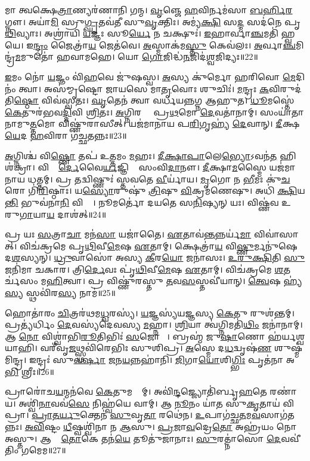 𑌮𑌾 𑌤𑍍𑌵𑌕𑍍𑌷𑍇\ul{𑌤𑍍𑌰𑌾}𑌣𑍍𑌯𑌰॑𑌣𑌾𑌨𑌿 𑌗𑌨𑍍𑌮।
\ul{𑌵𑍃}𑌞𑍍𑌜𑍇 \ul{𑌹}𑌵𑌿𑌰𑍍𑌨𑌮॑𑌸𑌾 \ul{𑌬}\ul{𑌰𑍍}𑌹𑌿\ul{𑌰}𑌗𑍍𑌨𑍗।
𑌅𑌯𑌾॑\ul{𑌮𑌿} 𑌸𑍍𑌰𑍁\ul{𑌗𑍍𑌘𑍃}𑌤𑌵॑𑌤𑍀 𑌸𑍁\ul{𑌵𑍃}𑌕𑍍𑌤𑌿𑌃।
𑌅𑌮𑍍𑌯॑\ul{𑌕𑍍𑌷𑌿} 𑌸\ul{𑌦𑍍𑌮} 𑌸𑌦॑𑌨𑍇 𑌪𑍃\ul{𑌥𑌿}𑌵𑍍𑌯𑌾𑌃।
𑌅𑌶𑍍𑌰𑌾॑𑌯𑌿 \ul{𑌯}𑌜𑍍𑌞𑌃 𑌸𑍂\ul{𑌰𑍍𑌯𑍇} 𑌨 𑌚𑌕𑍍𑌷𑍁𑌃॑।
\ul{𑌇}𑌹𑌾𑌰𑍍𑌵𑌾\ul{𑌞𑍍𑌚}𑌮𑌤𑌿॑ 𑌹𑍍𑌵𑌯𑍇।
𑌇\ul{𑌨𑍍𑌦𑍍𑌰𑌂} 𑌜𑍈𑌤𑍍𑌰𑌾॑\ul{𑌯} 𑌜𑍇𑌤॑𑌵𑍇।
\ul{𑌅}𑌸𑍍𑌮𑌾𑌕॑𑌮\ul{𑌸𑍍𑌤𑍁} 𑌕𑍇𑌵॑𑌲𑌃।
\ul{𑌅}𑌰𑍍𑌵𑌾\ul{𑌞𑍍𑌚}𑌮𑌿𑌨𑍍𑌦𑍍𑌰॑\ul{𑌮}𑌮𑍁𑌤𑍋॑ 𑌹𑌵𑌾𑌮𑌹𑍇।
𑌯𑍋 \ul{𑌗𑍋}𑌜𑌿𑌦𑍍𑌧॑\ul{𑌨}𑌜𑌿𑌦॑\ul{𑌶𑍍𑌵}\-𑌜𑌿𑌦𑍍𑌯𑌃॥22॥

\ul{𑌇}𑌮𑌂 𑌨𑍋॑ \ul{𑌯}𑌜𑍍𑌞𑌂 𑌵𑌿॑\ul{𑌹}𑌵𑍇 𑌜𑍁॑𑌷𑌸𑍍𑌵।
\ul{𑌅}𑌸𑍍𑌯 𑌕𑍁॑𑌰𑍍𑌮𑍋 𑌹𑌰𑌿𑌵𑍋 \ul{𑌮𑍇}𑌦𑌿𑌨𑌂॑ 𑌤𑍍𑌵𑌾।
𑌅𑌸॑𑌮𑍍𑌮𑍃𑌷𑍍𑌟𑍋 𑌜𑌾𑌯𑌸𑍇 𑌮𑌾\ul{𑌤𑍃}𑌵𑍋𑌃 𑌶𑍁𑌚𑌿𑌃॑।
\ul{𑌮}𑌨𑍍𑌦𑍍𑌰𑌃 \ul{𑌕}𑌵𑌿𑌰𑍁𑌦॑𑌤𑌿\ul{𑌷𑍍𑌠𑍋} 𑌵𑌿𑌵॑𑌸𑍍𑌵𑌤𑌃।
\ul{𑌘𑍃}𑌤𑍇𑌨॑ 𑌤𑍍𑌵𑌾 𑌵𑌰𑍍𑌧𑌯𑌨𑍍𑌨𑌗𑍍𑌨 𑌆𑌹𑍁𑌤।
\ul{𑌧𑍂}𑌮𑌸𑍍𑌤𑍇॑ \ul{𑌕𑍇}𑌤𑍁𑌰॑𑌭𑌵\ul{𑌦𑍍𑌦𑌿}𑌵𑌿 \ul{𑌶𑍍𑌰𑌿}𑌤𑌃।
\ul{𑌅}𑌗𑍍𑌨𑌿𑌰𑌗𑍍𑌰𑍇᳚ 𑌪𑍍𑌰\ul{𑌥}𑌮𑍋 \ul{𑌦𑍇}𑌵𑌤𑌾॑𑌨𑌾𑌮𑍍।
𑌸𑌂𑌯𑌾॑𑌤𑌾𑌨𑌾𑌮𑍁\ul{𑌤𑍍𑌤}𑌮𑍋 𑌵𑌿𑌷𑍍𑌣𑍁॑𑌰𑌾𑌸𑍀𑌤𑍍।
𑌯𑌜॑𑌮𑌾𑌨𑌾𑌯 𑌪\ul{𑌰𑌿}𑌗𑍃𑌹𑍍𑌯॑ \ul{𑌦𑍇}𑌵𑌾𑌨𑍍।
\ul{𑌦𑍀}𑌕𑍍𑌷\ul{𑌯𑍇}𑌦 \ul{𑌹}𑌵𑌿𑌰𑌾 𑌗॑𑌚𑍍𑌛𑌤𑌨𑍍𑌨𑌃॥23॥

\ul{𑌅}𑌗𑍍𑌨𑌿𑌶𑍍𑌚॑ 𑌵𑌿\ul{𑌷𑍍𑌣𑍋} 𑌤𑌪॑ 𑌉\ul{𑌤𑍍𑌤}𑌮𑌂 \ul{𑌮}𑌹𑌃।
\ul{𑌦𑍀}\ul{𑌕𑍍𑌷𑌾}\ul{𑌪𑌾}𑌲𑍇\ul{𑌭𑍍𑌯𑍋}\-𑌽𑌵𑌨॑\ul{𑌤}\ul{} 𑌹𑌿 𑌶॑𑌕𑍍𑌰𑌾।
𑌵𑌿𑌶𑍍𑌵𑍈᳚\ul{𑌰𑍍𑌦𑍇}𑌵𑍈\ul{𑌰𑍍𑌯}𑌜𑍍𑌞𑌿𑌯𑍈𑌃᳚ 𑌸𑌂𑌵𑌿\ul{𑌦𑌾}𑌨𑍗।
\ul{𑌦𑍀}𑌕𑍍𑌷𑌾\ul{𑌮}𑌸𑍍𑌮𑍈 𑌯𑌜॑𑌮𑌾𑌨𑌾𑌯 𑌧𑌤𑍍𑌤𑌮𑍍।
𑌪𑍍𑌰 𑌤𑌦𑍍𑌵𑌿𑌷𑍍𑌣𑍁𑌃॑ 𑌸𑍍𑌤𑌵𑌤𑍇 \ul{𑌵𑍀}𑌰𑍍𑌯𑌾॑𑌯।
\ul{𑌮𑍃}𑌗𑍋 𑌨 \ul{𑌭𑍀}𑌮𑌃 𑌕𑍁॑\ul{𑌚}𑌰𑍋 𑌗𑌿॑\ul{𑌰𑌿}𑌷𑍍𑌠𑌾𑌃।
𑌯\ul{𑌸𑍍𑌯𑍋}𑌰𑍁𑌷𑍁॑ \ul{𑌤𑍍𑌰𑌿}𑌷𑍁 \ul{𑌵𑌿}𑌕𑍍𑌰𑌮॑𑌣𑍇𑌷𑍁।
𑌅𑌧𑌿॑ \ul{𑌕𑍍𑌷𑌿}𑌯\ul{𑌨𑍍𑌤𑌿} 𑌭𑍁𑌵॑𑌨𑌾\ul{𑌨𑌿} 𑌵𑌿𑌶𑍍𑌵𑌾᳚।
𑌨𑍂𑌮𑌰𑍍𑌤𑍋॑ 𑌦𑌯𑌤𑍇 𑌸\ul{𑌨𑌿}𑌷𑍍𑌯𑌨𑍍 𑌯𑌃।
𑌵𑌿𑌷𑍍𑌣॑𑌵 𑌉𑌰𑍁\ul{𑌗𑌾}𑌯𑌾\ul{𑌯} 𑌦𑌾𑌶॑𑌤𑍍॥24॥

𑌪𑍍𑌰 𑌯𑌃 \ul{𑌸}𑌤𑍍𑌰𑌾\ul{𑌚𑌾} 𑌮𑌨॑\ul{𑌸𑌾} 𑌯𑌜𑌾॑𑌤𑍈।
\ul{𑌏}𑌤𑌾𑌵॑\ul{𑌨𑍍𑌤}𑌨𑍍𑌨𑌰𑍍𑌯॑\ul{𑌮𑌾} 𑌵𑌿𑌵𑌾॑𑌸𑌾𑌤𑍍।
𑌵𑌿𑌚॑𑌕𑍍𑌰𑌮𑍇 𑌪𑍃\ul{𑌥𑌿}𑌵𑍀\ul{𑌮𑍇}𑌷 \ul{𑌏}𑌤𑌾𑌮𑍍।
𑌕𑍍𑌷𑍇𑌤𑍍𑌰𑌾॑\ul{𑌯} 𑌵𑌿\ul{𑌷𑍍𑌣𑍁}𑌰𑍍𑌮𑌨𑍁॑𑌷𑍇 𑌦\ul{𑌶}𑌸𑍍𑌯𑌨𑍍।
\ul{𑌧𑍍𑌰𑍁}𑌵𑌾𑌸𑍋॑ 𑌅𑌸𑍍𑌯 \ul{𑌕𑍀}𑌰\ul{𑌯𑍋} 𑌜𑌨𑌾॑𑌸𑌃।
\ul{𑌉}\ul{𑌰𑍁}\ul{𑌕𑍍𑌷𑌿}𑌤𑌿 \ul{𑌸𑍁}𑌜𑌨𑌿॑𑌮𑌾 𑌚𑌕𑌾𑌰।
𑌤𑍍𑌰𑌿\ul{𑌰𑍍𑌦𑍇}𑌵𑌃 𑌪𑍃॑\ul{𑌥𑌿}𑌵𑍀\ul{𑌮𑍇}𑌷 \ul{𑌏}𑌤𑌾𑌮𑍍।
𑌵𑌿𑌚॑𑌕𑍍𑌰𑌮𑍇 \ul{𑌶}𑌤𑌰𑍍𑌚॑𑌸𑌂 𑌮\ul{𑌹𑌿}𑌤𑍍𑌵𑌾।
𑌪𑍍𑌰 𑌵𑌿𑌷𑍍𑌣𑍁॑𑌰𑌸𑍍𑌤𑍁 \ul{𑌤}𑌵\ul{𑌸}𑌸𑍍𑌤𑌵𑍀॑𑌯𑌾𑌨𑍍।
\ul{𑌤𑍍𑌵𑍇}𑌷 𑌹𑍍𑌯॑\ul{𑌸𑍍𑌯} 𑌸𑍍𑌥𑌵𑌿॑𑌰\ul{𑌸𑍍𑌯} 𑌨𑌾𑌮॑॥25॥

𑌹𑍋𑌤𑌾॑𑌰𑌂 \ul{𑌚𑌿}𑌤𑍍𑌰𑌰॑𑌥𑌮\ul{𑌧𑍍𑌵}𑌰𑌸𑍍𑌯॑।
\ul{𑌯}𑌜𑍍𑌞𑌸𑍍𑌯॑𑌯𑌜𑍍𑌞𑌸𑍍𑌯 \ul{𑌕𑍇}𑌤𑍁 𑌰𑍁𑌶॑𑌨𑍍𑌤𑌮𑍍।
𑌪𑍍𑌰𑌤𑍍𑌯॑𑌰𑍍𑌧𑌿𑌂 \ul{𑌦𑍇}𑌵𑌸𑍍𑌯॑𑌦𑍇𑌵𑌸𑍍𑌯 \ul{𑌮}𑌹𑍍𑌨𑌾।
\ul{𑌶𑍍𑌰𑌿}𑌯𑌾 𑌤𑍍𑌵॑𑌗𑍍𑌨𑌿𑌮𑌤𑌿॑\ul{𑌥𑌿𑌂} 𑌜𑌨𑌾॑𑌨𑌾𑌮𑍍।
𑌆 \ul{𑌨𑍋} 𑌵𑌿𑌶𑍍𑌵𑌾॑𑌭𑌿\ul{𑌰𑍂}𑌤𑌿𑌭𑌿𑌃॑ \ul{𑌸}𑌜𑍋𑌷𑌾𑌃᳚।
𑌬𑍍𑌰𑌹𑍍𑌮॑ 𑌜𑍁\ul{𑌷𑌾}𑌣𑍋 𑌹॑𑌰𑍍𑌯𑌶𑍍𑌵 𑌯𑌾𑌹𑌿।
𑌵𑌰𑍀॑𑌵𑍃\ul{𑌜}𑌥𑍍𑌸𑍍𑌥𑌵𑌿॑𑌰𑍇𑌭𑌿𑌃 𑌸𑍁𑌶𑌿𑌪𑍍𑌰।
\ul{𑌅}𑌸𑍍𑌮𑍇 𑌦\ul{𑌧}𑌦𑍍𑌵𑍃𑌷॑\ul{𑌣}\ul{} 𑌶𑍁𑌷𑍍𑌮॑𑌮𑌿𑌨𑍍𑌦𑍍𑌰।
𑌇𑌨𑍍𑌦𑍍𑌰𑌃॑ 𑌸𑍁\ul{𑌵}\ul{𑌰𑍍}𑌷𑌾 \ul{𑌜}𑌨\ul{𑌯}𑌨𑍍𑌨𑌹𑌾॑𑌨𑌿।
\ul{𑌜𑌿}𑌗𑌾\ul{𑌯𑍋}𑌶𑌿\ul{𑌗𑍍𑌭𑌿𑌃} 𑌪𑍃𑌤॑𑌨𑌾 𑌅\ul{𑌭𑌿} 𑌶𑍍𑌰𑍀𑌃॥26॥

𑌪𑍍𑌰𑌾𑌰𑍋॑𑌚\ul{𑌯}𑌨𑍍𑌮𑌨॑𑌵𑍇 \ul{𑌕𑍇}𑌤𑍁𑌮𑌹𑍍𑌨𑌾᳚𑌮𑍍।
𑌅𑌵𑌿॑\ul{𑌨𑍍𑌦}𑌜𑍍𑌜𑍍𑌯𑍋𑌤𑌿॑𑌰𑍍𑌬𑍃\ul{𑌹}𑌤𑍇 𑌰𑌣𑌾॑𑌯।
𑌅𑌶𑍍𑌵𑌿॑\ul{𑌨𑌾}𑌵𑌵॑\ul{𑌸𑍇} 𑌨𑌿𑌹𑍍𑌵॑𑌯𑍇 𑌵𑌾𑌮𑍍।
𑌆 \ul{𑌨𑍂}𑌨𑌂 𑌯𑌾॑𑌤 𑌸𑍁\ul{𑌕𑍃}𑌤𑌾𑌯॑ 𑌵𑌿𑌪𑍍𑌰𑌾।
\ul{𑌪𑍍𑌰𑌾}\ul{𑌤}\ul{𑌰𑍍𑌯𑍁}𑌕𑍍𑌤𑍇𑌨॑ \ul{𑌸𑍁}𑌵𑍃\ul{𑌤𑌾} 𑌰𑌥𑍇॑𑌨।
\ul{𑌉}𑌪𑌾𑌗॑𑌚𑍍𑌛\ul{𑌤}𑌮\ul{𑌵}𑌸𑌾𑌗॑𑌤𑌨𑍍𑌨𑌃।
\ul{𑌅}\ul{𑌵𑌿}𑌷𑍍𑌟𑌂 \ul{𑌧𑍀}𑌷𑍍𑌵𑌶𑍍𑌵𑌿॑𑌨𑌾 𑌨 \ul{𑌆}𑌸𑍁।
\ul{𑌪𑍍𑌰}𑌜𑌾\ul{𑌵}𑌦𑍍𑌰𑍇\ul{𑌤𑍋} 𑌅𑌹𑍍𑌰॑𑌯𑌂 𑌨𑍋 𑌅𑌸𑍍𑌤𑍁।
𑌆𑌵𑌾𑌂᳚ \ul{𑌤𑍋}𑌕𑍇 𑌤𑌨॑\ul{𑌯𑍇} 𑌤𑍂𑌤𑍁॑𑌜𑌾𑌨𑌾𑌃।
\ul{𑌸𑍁}𑌰𑌤𑍍𑌨𑌾॑𑌸𑍋 \ul{𑌦𑍇}𑌵𑌵𑍀॑𑌤𑌿𑌂 𑌗𑌮𑍇𑌮॥27॥

